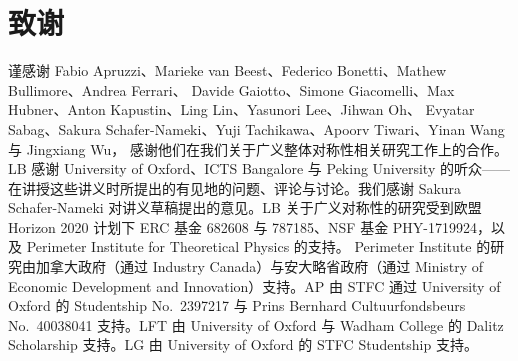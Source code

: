 \clearpage
\section*{致谢}

谨感谢 Fabio Apruzzi、Marieke van Beest、Federico Bonetti、Mathew Bullimore、Andrea Ferrari、
Davide Gaiotto、Simone Giacomelli、Max Hubner、Anton Kapustin、Ling Lin、Yasunori Lee、Jihwan Oh、
Evyatar Sabag、Sakura Schafer-Nameki、Yuji Tachikawa、Apoorv Tiwari、Yinan Wang 与 Jingxiang Wu，
感谢他们在我们关于广义整体对称性相关研究工作上的合作。LB 感谢 University of Oxford、ICTS Bangalore
与 Peking University 的听众——在讲授这些讲义时所提出的有见地的问题、评论与讨论。我们感谢
Sakura Schafer-Nameki 对讲义草稿提出的意见。LB 关于广义对称性的研究受到欧盟 Horizon 2020 计划下
ERC 基金 682608 与 787185、NSF 基金 PHY-1719924，以及 Perimeter Institute for Theoretical Physics 的支持。
Perimeter Institute 的研究由加拿大政府（通过 Industry Canada）与安大略省政府（通过 Ministry of Economic
Development and Innovation）支持。AP 由 STFC 通过 University of Oxford 的 Studentship No.~2397217
与 Prins Bernhard Cultuurfondsbeurs No.~40038041 支持。LFT 由 University of Oxford 与 Wadham College
的 Dalitz Scholarship 支持。LG 由 University of Oxford 的 STFC Studentship 支持。
